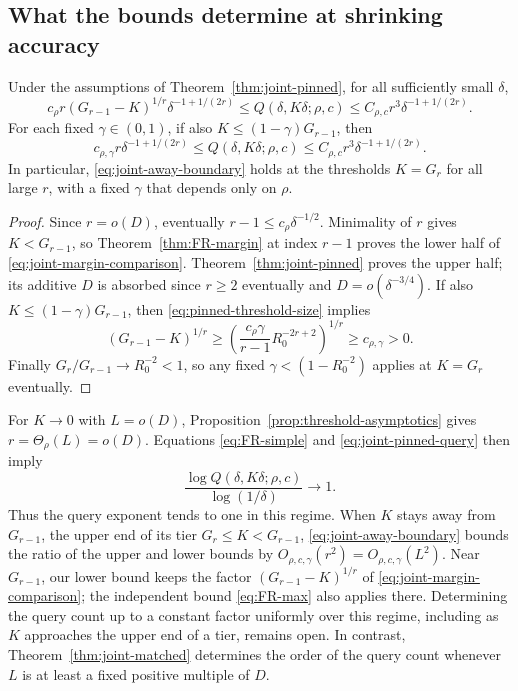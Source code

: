 \subsection{What the bounds determine at shrinking accuracy}
\begin{corollary}\label{cor:joint-near-match}
Under the assumptions of Theorem~\ref{thm:joint-pinned}, for all sufficiently small $\delta$,
\begin{equation}\label{eq:joint-margin-comparison}
 c_\rho r(G_{r-1}-K)^{1/r}\delta^{-1+1/(2r)}
 \leq Q(\delta,K\delta;\rho,c)
 \leq C_{\rho,c}r^3\delta^{-1+1/(2r)}.
\end{equation}
For each fixed $\gamma\in(0,1)$, if also $K\leq(1-\gamma)G_{r-1}$, then
\begin{equation}\label{eq:joint-away-boundary}
 c_{\rho,\gamma}r\delta^{-1+1/(2r)}
 \leq Q(\delta,K\delta;\rho,c)
 \leq C_{\rho,c}r^3\delta^{-1+1/(2r)}.
\end{equation}
In particular, \eqref{eq:joint-away-boundary} holds at the thresholds $K=G_r$ for all large $r$, with a fixed $\gamma$ that depends only on $\rho$.
\end{corollary}
\begin{proof}
Since $r=o(D)$, eventually $r-1\leq c_\rho\delta^{-1/2}$. Minimality of $r$ gives $K<G_{r-1}$, so Theorem~\ref{thm:FR-margin} at index $r-1$ proves the lower half of \eqref{eq:joint-margin-comparison}. Theorem~\ref{thm:joint-pinned} proves the upper half; its additive $D$ is absorbed since $r\geq2$ eventually and $D=o(\delta^{-3/4})$. If also $K\leq(1-\gamma)G_{r-1}$, then \eqref{eq:pinned-threshold-size} implies
\[
 (G_{r-1}-K)^{1/r}\geq
 \left(\frac{c_\rho\gamma}{r-1}R_0^{-2r+2}\right)^{1/r}
 \geq c_{\rho,\gamma}>0.
\]
Finally $G_r/G_{r-1}\to R_0^{-2}<1$, so any fixed $\gamma<(1-R_0^{-2})$ applies at $K=G_r$ eventually.
\end{proof}
For $K\to0$ with $L=o(D)$, Proposition~\ref{prop:threshold-asymptotics} gives $r=\Theta_\rho(L)=o(D)$. Equations \eqref{eq:FR-simple} and \eqref{eq:joint-pinned-query} then imply
\[
 \frac{\log Q(\delta,K\delta;\rho,c)}{\log(1/\delta)}\longrightarrow1.
\]
Thus the query exponent tends to one in this regime. When $K$ stays away from $G_{r-1}$, the upper end of its tier $G_r\leq K<G_{r-1}$, \eqref{eq:joint-away-boundary} bounds the ratio of the upper and lower bounds by $O_{\rho,c,\gamma}(r^2)=O_{\rho,c,\gamma}(L^2)$. Near $G_{r-1}$, our lower bound keeps the factor $(G_{r-1}-K)^{1/r}$ of \eqref{eq:joint-margin-comparison}; the independent bound \eqref{eq:FR-max} also applies there. Determining the query count up to a constant factor uniformly over this regime, including as $K$ approaches the upper end of a tier, remains open. In contrast, Theorem~\ref{thm:joint-matched} determines the order of the query count whenever $L$ is at least a fixed positive multiple of $D$.
